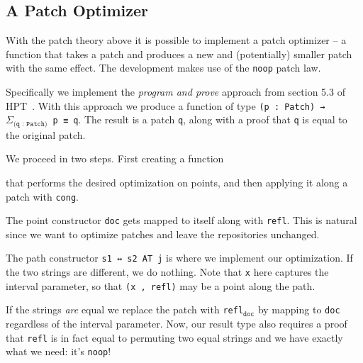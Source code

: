 \subsection{A Patch Optimizer}\label{subsec/opt}

With the patch theory above it is possible to implement a patch optimizer --
a function that takes a patch and produces a new and (potentially) smaller patch
with the same effect. The development makes use of the \texttt{noop} patch law.

Specifically we implement the \emph{program and prove} approach from section 5.3 of HPT~\cite{Angiuli2016}.
With this approach we produce a function of type \texttt{(p : Patch) → $\Sigma_\texttt{(q : Patch)}$ p ≡ q}.
The result is a patch \texttt{q}, along with a proof that \texttt{q} is equal to the original patch.

We proceed in two steps. First creating a function
\begin{code}%
\>[0]\AgdaSpace{}%
\AgdaSymbol{:}\AgdaSpace{}%
\AgdaSymbol{(}\AgdaSpace{}%
\AgdaSymbol{:}\AgdaSpace{}%
\AgdaSymbol{)}\AgdaSpace{}%
\AgdaSpace{}%
\AgdaFunction{Σ[}\AgdaSpace{}%
\AgdaSpace{}%
\AgdaSpace{}%
\AgdaSpace{}%
\AgdaFunction{]}\AgdaSpace{}%
\AgdaSpace{}%
\AgdaSpace{}%
\<%
\end{code}
that performs the desired optimization on points, and then applying it along
a patch with \texttt{cong}.

The point constructor \texttt{doc} gets mapped to itself along with \texttt{refl}.
This is natural since we want to optimize patches and leave the repositories unchanged.
\begin{code}%
\>[0]\AgdaSpace{}%
\AgdaSpace{}%
\AgdaSymbol{=}\AgdaSpace{}%
\AgdaSymbol{(}\AgdaSpace{}%
\AgdaOperator{\AgdaInductiveConstructor{,}}\AgdaSpace{}%
\AgdaSymbol{)}\<%
\end{code}
The path constructor \texttt{s1 ↔ s2 AT j} is where we implement our optimization.
If the two strings are different, we do nothing. Note that \texttt{x} here captures the
interval parameter, so that \texttt{(x , refl)} may be a point along the path.

If the strings \emph{are} equal we replace the patch with \texttt{refl$_\texttt{doc}$} by
mapping to \texttt{doc} regardless of the interval parameter. Now, our result type also requires
a proof that \texttt{refl} is in fact equal to permuting two equal strings and we have exactly
what we need: it's \texttt{noop}!

